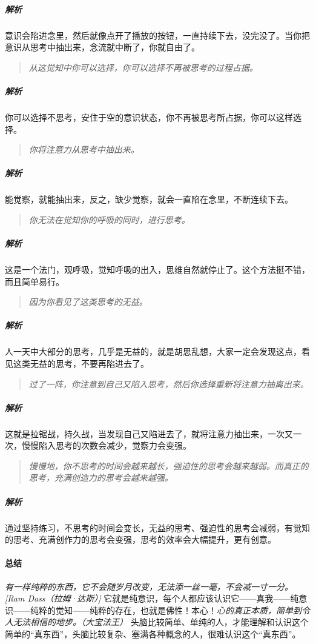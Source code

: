 \subparagraph{解析} 意识会陷进念里，然后就像点开了播放的按钮，一直持续下去，没完没了。当你把意识从思考中抽出来，念流就中断了，你就自由了。

\begin{quote}\it
    从这觉知中你可以选择，你可以选择不再被思考的过程占据。
\end{quote}

\subparagraph{解析} 你可以选择不思考，安住于空的意识状态，你不再被思考所占据，你可以这样选择。

\begin{quote}\it
    你将注意力从思考中抽出来。
\end{quote}

\subparagraph{解析} 能觉察，就能抽出来，反之，缺少觉察，就会一直陷在念里，不断连续下去。

\begin{quote}\it
    你无法在觉知你的呼吸的同时，进行思考。
\end{quote}

\subparagraph{解析} 这是一个法门，观呼吸，觉知呼吸的出入，思维自然就停止了。这个方法挺不错，而且简单易行。

\begin{quote}\it
    因为你看见了这类思考的无益。
\end{quote}

\subparagraph{解析} 人一天中大部分的思考，几乎是无益的，就是胡思乱想，大家一定会发现这点，看见这类无益的思考，不要再陷进去了。

\begin{quote}\it
    过了一阵，你注意到自己又陷入思考，然后你选择重新将注意力抽离出来。
\end{quote}

\subparagraph{解析} 这就是拉锯战，持久战，当发现自己又陷进去了，就将注意力抽出来，一次又一次，慢慢陷入思考的次数会减少，觉察力会变强。

\begin{quote}\it
    慢慢地，你不思考的时间会越来越长，强迫性的思考会越来越弱。而真正的思考，充满创造力的思考会越来越强。
\end{quote}

\subparagraph{解析} 通过坚持练习，不思考的时间会变长，无益的思考、强迫性的思考会减弱，有觉知的思考、充满创作力的思考会变强，思考的效率会大幅提升，更有创意。

\paragraph{总结}

\textit{有一样纯粹的东西，它不会随岁月改变，无法添一丝一毫，不会减一寸一分。[Ram Dass（拉姆·达斯）]} 它就是纯意识，每个人都应该认识它——真我——纯意识——纯粹的觉知——纯粹的存在，也就是佛性！本心！\textit{心的真正本质，简单到令人无法相信的地步。（大宝法王）} 头脑比较简单、单纯的人，才能理解和认识这个简单的“真东西”，头脑比较复杂、塞满各种概念的人，很难认识这个“真东西”。

